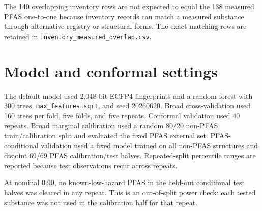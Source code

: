 \documentclass[11pt]{article}
\begin{document}
The 140 overlapping inventory rows are not expected to equal the 138 measured PFAS
one-to-one because inventory records can match a measured substance through alternative
registry or structural forms. The exact matching rows are retained in
\texttt{inventory\_measured\_overlap.csv}.

\section{Model and conformal settings}

The default model used 2,048-bit ECFP4 fingerprints and a random forest with 300 trees,
\texttt{max\_features=sqrt}, and seed 20260620. Broad cross-validation used 160 trees per
fold, five folds, and five repeats. Conformal validation used 40 repeats. Broad marginal
calibration used a random 80/20 non-PFAS train/calibration split and evaluated the fixed
PFAS external set. PFAS-conditional validation used a fixed model trained on all non-PFAS
structures and disjoint 69/69 PFAS calibration/test halves. Repeated-split percentile
ranges are reported because test observations recur across repeats.

\begin{table}[h]
\centering
\caption{Repeated-split coverage and interval width on PFAS. Values are means across 40
repeats; ranges in parentheses are the 2.5th--97.5th percentiles across repeats. Width is
in $\log_{10}$ mg/L.}
\small
{}
\end{table}

At nominal 0.90, no known-low-hazard PFAS in the held-out conditional test halves was
cleared in any repeat. This is an out-of-split power check: each tested substance was not
used in the calibration half for that repeat.
\end{document}
